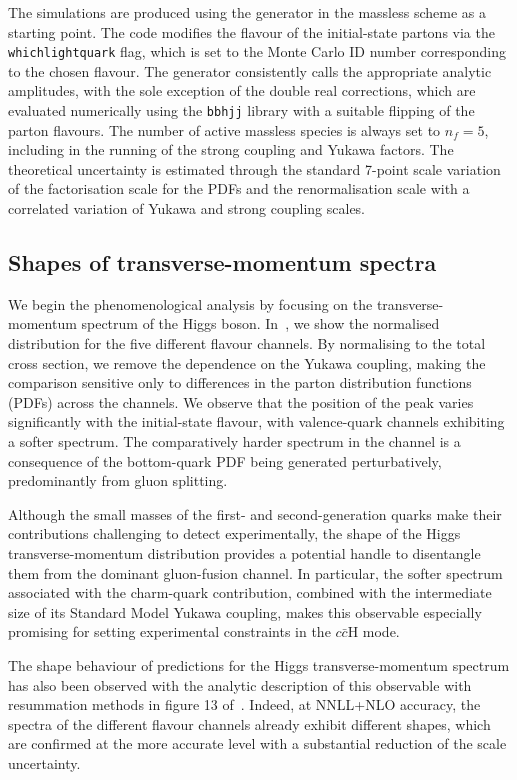 \documentclass[11pt,a4paper]{article}
\begin{document}
The simulations are produced using the \minnlo{} \bbH{} generator in the massless scheme as a starting point. The code modifies the flavour of the initial-state partons via the \texttt{whichlightquark} flag, which is set to the Monte Carlo ID number corresponding to the chosen flavour. The generator consistently calls the appropriate analytic amplitudes, with the sole exception of the double real corrections, which are evaluated numerically using the \OpenLoops{} \texttt{bbhjj} library with a suitable flipping of the parton flavours. The number of active massless species is always set to \( n_f = 5 \), including in the running of the strong coupling and Yukawa factors. The theoretical uncertainty is estimated through the standard 7-point scale variation of the factorisation scale for the PDFs and the renormalisation scale with a correlated variation of Yukawa and strong coupling scales.

\subsection{Shapes of transverse-momentum spectra}
We begin the phenomenological analysis by focusing on the transverse-momentum spectrum of the Higgs boson. In~, we show the normalised distribution for the five different flavour channels. By normalising to the total cross section, we remove the dependence on the Yukawa coupling, making the comparison sensitive only to differences in the parton distribution functions (PDFs) across the channels. We observe that the position of the peak varies significantly with the initial-state flavour, with valence-quark channels exhibiting a softer spectrum. The comparatively harder spectrum in the \bbH{} channel is a consequence of the bottom-quark PDF being generated perturbatively, predominantly from gluon splitting.

Although the small masses of the first- and second-generation quarks make their contributions challenging to detect experimentally, the shape of the Higgs transverse-momentum distribution provides a potential handle to disentangle them from the dominant gluon-fusion channel. In particular, the softer spectrum associated with the charm-quark contribution, combined with the intermediate size of its Standard Model Yukawa coupling, makes this observable especially promising for setting experimental constraints in the $c\bar c \text{H}$ mode.

The shape behaviour of \minnlo{} predictions for the Higgs transverse-momentum spectrum has also been observed with the analytic description of this observable with resummation methods in figure 13 of~. Indeed, at NNLL+NLO accuracy, the spectra of the different flavour channels already exhibit different shapes, which are confirmed at the more accurate \nnnres{} level with a substantial reduction of the scale uncertainty.
\end{document}
